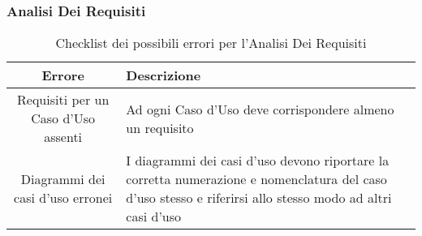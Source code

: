 \subsubsection{Analisi Dei Requisiti}
\begin{table}[h]
\centering
\begin{tabular}{|c|p{8cm}|}
\hline
\textbf{Errore} & \textbf{Descrizione} \\
\hline
Requisiti per un Caso d'Uso assenti &  Ad ogni Caso d'Uso deve corrispondere almeno un requisito\\
\hline
Diagrammi dei casi d'uso erronei & I diagrammi dei casi d'uso devono riportare la corretta numerazione e nomenclatura del caso d'uso stesso e riferirsi allo stesso modo ad altri casi d'uso\\
\hline
\end{tabular}
\caption{Checklist dei possibili errori per l'Analisi Dei Requisiti}
\end{table}